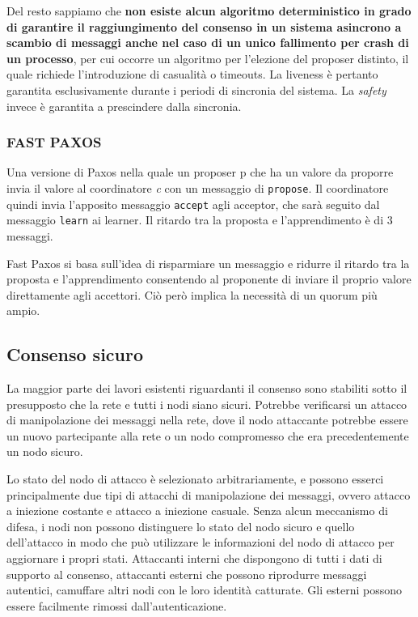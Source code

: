 Del resto sappiamo che \textbf{non esiste alcun algoritmo deterministico in grado di garantire il raggiungimento del consenso in un sistema asincrono a scambio di messaggi anche nel caso di un unico fallimento per crash di un processo}, per cui occorre un algoritmo per l'elezione del proposer distinto, il quale richiede l'introduzione di casualità o timeouts. La liveness è pertanto garantita esclusivamente durante i periodi di sincronia del sistema. La \textit{safety} invece è garantita a prescindere dalla sincronia.

\subsubsection{FAST PAXOS}
Una versione di Paxos nella quale un proposer p che ha un valore da proporre invia il valore al coordinatore \textit{c} con un messaggio di \texttt{propose}. Il coordinatore quindi invia l'apposito messaggio \texttt{accept} agli acceptor, che sarà seguito dal messaggio \texttt{learn} ai learner. Il ritardo tra la proposta e l'apprendimento è di 3 messaggi.

Fast Paxos si basa sull'idea di risparmiare un messaggio e ridurre il ritardo tra la proposta e l'apprendimento consentendo al proponente di inviare il proprio valore direttamente agli accettori. Ciò però implica la necessità di un quorum più ampio.

\subsection{Consenso sicuro}
La maggior parte dei lavori esistenti riguardanti il consenso sono stabiliti sotto il presupposto che la rete e tutti i nodi siano sicuri. Potrebbe verificarsi un attacco di manipolazione dei messaggi nella rete, dove il nodo attaccante potrebbe essere un nuovo partecipante alla rete o un nodo compromesso che era precedentemente un nodo sicuro.

Lo stato del nodo di attacco è selezionato arbitrariamente, e possono esserci principalmente due tipi di attacchi di manipolazione dei messaggi, ovvero attacco a iniezione costante e attacco a iniezione casuale. Senza alcun meccanismo di difesa, i nodi non possono distinguere lo stato del nodo sicuro e quello dell'attacco in modo che può utilizzare le informazioni del nodo di attacco per aggiornare i propri stati. Attaccanti interni che dispongono di tutti i dati di supporto al consenso, attaccanti esterni che possono riprodurre messaggi autentici, camuffare altri nodi con le loro identità catturate. Gli esterni possono essere facilmente rimossi dall'autenticazione.

